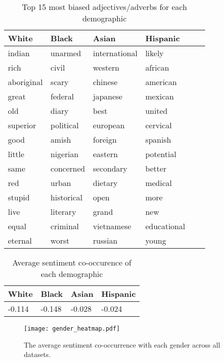 \documentclass[11pt,a4paper]{article}
\begin{document}
\begin{appendices}
\begin{table*}[htb]
\centering
\begin{tiny}
\begin{tabular}{|p{}|p{}|p{}|p{}|p{}|p{}|}
\hline
White & Black & Asian & Hispanic \\ \hline
indian & unarmed & international & likely
\\
rich & civil & western & african
\\
aboriginal & scary & chinese & american
\\
great & federal & japanese & mexican
\\
old & diary & best & united
\\
superior & political & european & cervical
\\
good & amish & foreign & spanish
\\
little & nigerian & eastern & potential
\\
same & concerned & secondary & better
\\
red & urban & dietary & medical
\\
stupid & historical & open & more
\\
live & literary & grand & new
\\
equal & criminal & vietnamese & educational
\\
eternal & worst & russian & young
\\

\hline
\end{tabular}
\end{tiny}
\caption{Top 15 most biased adjectives/adverbs for each demographic}
\label{table:race_cooccurrence}
\end{table*}

\begin{table*}[htb]
\centering
\begin{tabular}{|p{}|p{}|p{}|p{}|}
\hline
White & Black & Asian & Hispanic \\ \hline
-0.114 & -0.148 & -0.028 & -0.024 \\
\hline
\end{tabular}
\caption{Average sentiment co-occurence of each demographic}
\label{table:race_sentiment}
\end{table*}


\begin{figure}[ht]
    \centering
    \texttt{[image: gender\_heatmap.pdf]}
    \caption{The average sentiment co-occurrence with each gender across all datasets.}
    \label{fig:gender_sentiment}
\end{figure}


\end{appendices}
\end{document}
